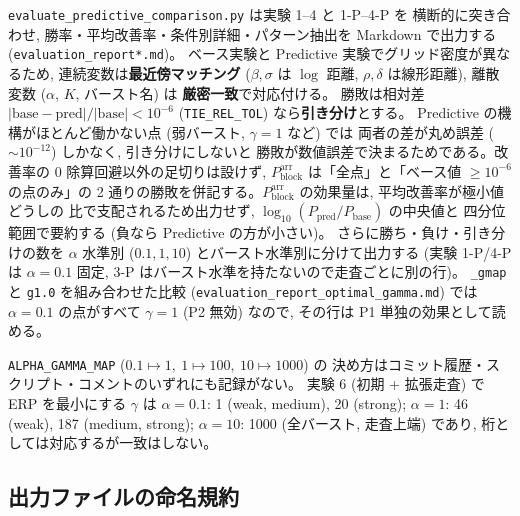 \documentclass[a4paper,11pt]{article}
\newcommand{\code}[1]{\texttt{#1}}
\newcommand{\blk}{\mathrm{block}}
\begin{document}
\code{evaluate\_predictive\_comparison.py} は実験 1--4 と 1-P--4-P を
横断的に突き合わせ, 勝率・平均改善率・条件別詳細・パターン抽出を
Markdown で出力する (\code{evaluation\_report*.md})。
ベース実験と Predictive 実験でグリッド密度が異なるため,
連続変数は\textbf{最近傍マッチング} ($\beta,\sigma$ は $\log$ 距離,
$\rho,\delta$ は線形距離), 離散変数 ($\alpha$, $K$, バースト名) は
\textbf{厳密一致}で対応付ける。
勝敗は相対差 $|\text{base}-\text{pred}|/|\text{base}|<10^{-6}$
(\code{TIE\_REL\_TOL}) なら\textbf{引き分け}とする。
Predictive の機構がほとんど働かない点 (弱バースト, $\gamma=1$ など) では
両者の差が丸め誤差 ($\sim10^{-12}$) しかなく, 引き分けにしないと
勝敗が数値誤差で決まるためである。改善率の 0 除算回避以外の足切りは設けず,
$P_\blk^{\mathrm{arr}}$ は「全点」と「ベース値 $\ge10^{-6}$ の点のみ」の
2 通りの勝敗を併記する。$P_\blk^{\mathrm{arr}}$ の効果量は, 平均改善率が極小値どうしの
比で支配されるため出力せず, $\log_{10}(P_{\mathrm{pred}}/P_{\mathrm{base}})$ の中央値と
四分位範囲で要約する (負なら Predictive の方が小さい)。
さらに勝ち・負け・引き分けの数を $\alpha$ 水準別 ($0.1, 1, 10$) とバースト水準別に分けて出力する
(実験 1-P/4-P は $\alpha=0.1$ 固定, 3-P はバースト水準を持たないので走査ごとに別の行)。
\code{\_gmap} と \code{g1.0} を組み合わせた比較 (\code{evaluation\_report\_optimal\_gamma.md}) では
$\alpha=0.1$ の点がすべて $\gamma=1$ (P2 無効) なので, その行は P1 単独の効果として読める。

\code{ALPHA\_GAMMA\_MAP} ($0.1\!\mapsto\!1,\ 1\!\mapsto\!100,\ 10\!\mapsto\!1000$) の
決め方はコミット履歴・スクリプト・コメントのいずれにも記録がない。
実験 6 (初期 + 拡張走査) で ERP を最小にする $\gamma$ は
$\alpha=0.1$: 1 (weak, medium), 20 (strong);
$\alpha=1$: 46 (weak), 187 (medium, strong);
$\alpha=10$: 1000 (全バースト, 走査上端) であり, 桁としては対応するが一致はしない。

\subsection{出力ファイルの命名規約}
\end{document}
